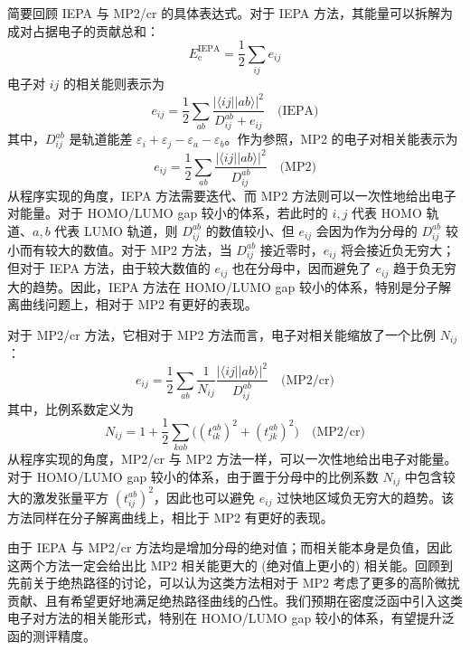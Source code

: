 简要回顾 IEPA 与 MP2/cr 的具体表达式。对于 IEPA 方法，其能量可以拆解为成对占据电子的贡献总和：
\begin{equation}
  E_\mathrm{c}^\mathrm{IEPA} = \frac{1}{2} \sum_{ij} e_{ij}
\end{equation}
电子对 $ij$ 的相关能则表示为
\begin{equation}
  e_{ij} = \frac{1}{2} \sum_{ab} \frac{|\langle ij || ab \rangle|^2}{D_{ij}^{ab} + e_{ij}} \quad \text{(IEPA)}
\end{equation}
其中，$D_{ij}^{ab}$ 是轨道能差 $\varepsilon_i + \varepsilon_j - \varepsilon_a - \varepsilon_b$。作为参照，MP2 的电子对相关能表示为
\begin{equation}
  e_{ij} = \frac{1}{2} \sum_{ab} \frac{|\langle ij || ab \rangle|^2}{D_{ij}^{ab}} \quad \text{(MP2)}
\end{equation}
从程序实现的角度，IEPA 方法需要迭代、而 MP2 方法则可以一次性地给出电子对能量。对于 HOMO/LUMO gap 较小的体系，若此时的 $i, j$ 代表 HOMO 轨道、$a, b$ 代表 LUMO 轨道，则 $D_{ij}^{ab}$ 的数值较小、但 $e_{ij}$ 会因为作为分母的 $D_{ij}^{ab}$ 较小而有较大的数值。对于 MP2 方法，当 $D_{ij}^{ab}$ 接近零时，$e_{ij}$ 将会接近负无穷大；但对于 IEPA 方法，由于较大数值的 $e_{ij}$ 也在分母中，因而避免了 $e_{ij}$ 趋于负无穷大的趋势。因此，IEPA 方法在 HOMO/LUMO gap 较小的体系，特别是分子解离曲线问题上，相对于 MP2 有更好的表现\cite{Zhang-Scheffler.NJP.2016, Zhang-Scheffler.PRL.2016}。

对于 MP2/cr 方法，它相对于 MP2 方法而言，电子对相关能缩放了一个比例 $N_{ij}$：
\begin{equation}
  e_{ij} = \frac{1}{2} \sum_{ab} \frac{1}{N_{ij}} \frac{|\langle ij || ab \rangle|^2}{D_{ij}^{ab}} \quad \text{(MP2/cr)}
\end{equation}
其中，比例系数定义为
\begin{equation}
  N_{ij} = 1 + \frac{1}{2} \sum_{kab} \big( (t_{ik}^{ab})^2 + (t_{jk}^{ab})^2 \big) \quad \text{(MP2/cr)}
\end{equation}
从程序实现的角度，MP2/cr 与 MP2 方法一样，可以一次性地给出电子对能量。对于 HOMO/LUMO gap 较小的体系，由于置于分母中的比例系数 $N_{ij}$ 中包含较大的激发张量平方 $(t_{ij}^{ab})^2$，因此也可以避免 $e_{ij}$ 过快地区域负无穷大的趋势。该方法同样在分子解离曲线上，相比于 MP2 有更好的表现\cite{Dykstra-Davidson.IJQC.2000}。

由于 IEPA 与 MP2/cr 方法均是增加分母的绝对值；而相关能本身是负值，因此这两个方法一定会给出比 MP2 相关能更大的 (绝对值上更小的) 相关能。回顾到先前关于绝热路径的讨论，可以认为这类方法相对于 MP2 考虑了更多的高阶微扰贡献、且有希望更好地满足绝热路径曲线的凸性。我们预期在密度泛函中引入这类电子对方法的相关能形式，特别在 HOMO/LUMO gap 较小的体系，有望提升泛函的测评精度。


